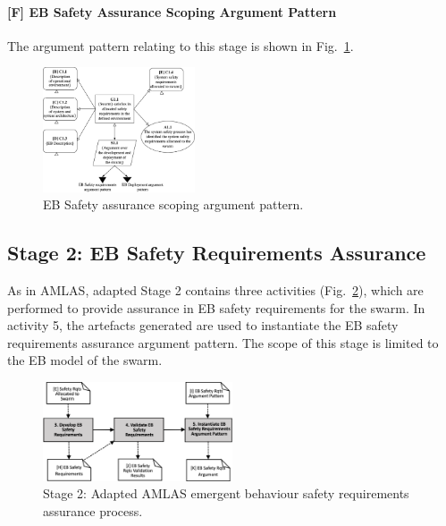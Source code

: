 \documentclass[lettersize,journal]{IEEEtran}
\begin{document}
\paragraph*{[F] EB Safety Assurance Scoping Argument Pattern}
The argument pattern relating to this stage is shown in Fig.~\ref{stage1-ap}. 
\begin{figure}
	\centering
	\includegraphics[width=0.4\textwidth]{figures/stage1-argumentpattern.png}
	\caption{EB Safety assurance scoping argument pattern.}
	\label{stage1-ap}
\end{figure}

\subsection{Stage 2: EB Safety Requirements Assurance} \label{framework-stage2}
As in AMLAS, adapted Stage 2 contains three activities (Fig.~\ref{amlas-a-stage2}), which are performed to provide assurance in EB safety requirements for the swarm. 
In activity 5, the artefacts generated are used to instantiate the EB safety requirements assurance argument pattern. 
The scope of this stage is limited to the EB model of the swarm.

\begin{figure}[!t]
	\centering
	\includegraphics[width=0.5\textwidth]{figures/amlas-a-stage2-v2.png}
	\caption{Stage 2: Adapted AMLAS emergent behaviour safety requirements assurance process.}
	\label{amlas-a-stage2}
\end{figure}
\end{document}
